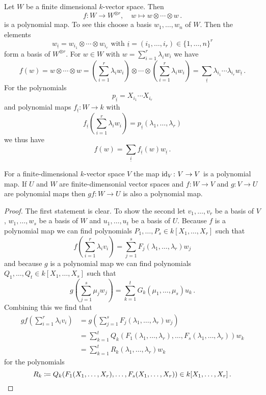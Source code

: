 \begin{expl}
  Let $W$ be a finite dimensional $k$-vector space. Then
  \[
            f
    \colon  W
    \to     W^{\otimes r},
    \quad   w
    \mapsto w \otimes \dotsb \otimes w \,.
  \]
  is a polynomial map.
  To see this choose a basis $w_1, \dotsc, w_n$ of $W$. Then the elements
  \[
      w_{\underline{i}}
    = w_{i_1} \otimes \dotsb \otimes w_{i_r}
    \text{ with }
        \underline{i}
    =   (i_1, \dotsc, i_r)
    \in \{1, \dotsc, n\}^r
  \]
  form a basis of $W^{\otimes r}$.
  For $w \in W$ with $w = \sum_{i=1}^r \lambda_i w_i$ we have
  \[
      f(w)
    = w \otimes \dotsb \otimes w
    =         \left( \sum_{i=1}^r \lambda_i w_i \right)
      \otimes \dotsb
      \otimes \left( \sum_{i=1}^r \lambda_i w_i \right)
    = \sum_{\underline{i}} \lambda_{i_1} \dotsm \lambda_{i_r} w_{\underline{i}} \,.
  \]
  For the polynomials
  \[
      p_{\underline{i}}
    = X_{i_1} \dotsm X_{i_r}
  \]
  and polynomial maps $f_{\underline{i}} \colon W \to k$ with
  \[
      f_{\underline{i}}\left( \sum_{i=1}^r \lambda_i w_i \right)
    = p_{\underline{i}}(\lambda_1, \dotsc, \lambda_r)
  \]
  we thus have
  \[
      f(w)
    = \sum_{\underline{i}} f_{\underline{i}}(w) w_{\underline{i}} \,.
  \]
\end{expl}


\begin{lem}
  For a finite-dimensional $k$-vector space $V$ the map $\operatorname{id}_V \colon V \to V$ is a polynomial map.
  If $U$ and $W$ are finite-dimensonial vector spaces and $f \colon W \to V$ and $g \colon V \to U$ are polynomial maps then $gf \colon W \to U$ is also a polynomial map.
\end{lem}
\begin{proof}
  The first statement is clear.
  To show the second let $v_1, \dotsc, v_r$ be a basis of $V$, $w_1, \dotsc, w_s$ be a basis of $W$ and $u_1, \dotsc, u_t$ be a basis of $U$.
  Because $f$ is a polynomial map we can find polynomials $P_1, \dotsc, P_s \in k[X_1, \dotsc, X_r]$ such that
  \[
      f\left( \sum_{i=1}^r \lambda_i v_i \right)
    = \sum_{j=1}^s F_j(\lambda_1, \dotsc, \lambda_r) w_j
  \]
  and because $g$ is a polynomial map we can find polynomials $Q_1, \dotsc, Q_t \in k[X_1, \dotsc, X_s]$ such that
  \[
      g\left( \sum_{j=1}^s \mu_j w_j \right)
    = \sum_{k=1}^t G_k(\mu_1, \dotsc, \mu_s) u_k \,.
  \]
  Combining this we find that
  \begin{align*}
        gf\left( \sum_{i=1}^r \lambda_i v_i \right)
    &=  g\left( \sum_{j=1}^s F_j(\lambda_1, \dotsc, \lambda_r) w_j \right) \\
    &=  \sum_{k=1}^t Q_k(F_1(\lambda_1, \dotsc, \lambda_r), \dotsc, F_s(\lambda_1, \dotsc, \lambda_r)) w_k \\
    &=  \sum_{k=1}^t R_k(\lambda_1, \dotsc, \lambda_r) w_k
  \end{align*}
  for the polynomials
  \[
              R_k
    \coloneqq Q_k(F_1(X_1, \dotsc, X_r), \dotsc, F_s(X_1, \dotsc, X_r))
    \in       k[X_1, \dotsc, X_r] \,.
    \qedhere
  \]
\end{proof}


